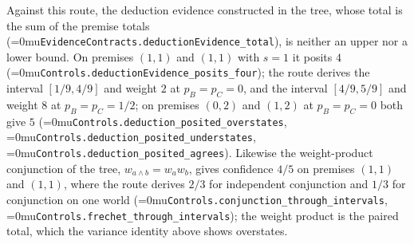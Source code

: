 \documentclass[11pt]{article}
\newcommand{\leanname}[1]{\textup{\Urlmuskip=0mu\relax\nolinkurl{#1}}}
\theoremstyle{definition}
\theoremstyle{remark}
\begin{document}
Against this route, the deduction evidence constructed in the tree, whose total
is the sum of the premise totals (\leanname{EvidenceContracts.deductionEvidence_total}),
is neither an upper nor a lower bound.  On premises $(1,1)$ and $(1,1)$ with
$s=1$ it posits $4$ (\leanname{Controls.deductionEvidence_posits_four}); the
route derives the interval $[1/9,4/9]$ and weight $2$ at $p_B=p_C=0$, and the
interval $[4/9,5/9]$ and weight $8$ at $p_B=p_C=1/2$; on premises $(0,2)$ and
$(1,2)$ at $p_B=p_C=0$ both give $5$ (\leanname{Controls.deduction_posited_overstates},
\leanname{Controls.deduction_posited_understates},
\leanname{Controls.deduction_posited_agrees}).  Likewise the weight-product
conjunction of the tree, $w_{a\wedge b}=w_aw_b$, gives confidence $4/5$ on
premises $(1,1)$ and $(1,1)$, where the route derives $2/3$ for independent
conjunction and $1/3$ for conjunction on one world
(\leanname{Controls.conjunction_through_intervals},
\leanname{Controls.frechet_through_intervals}); the weight product is the paired
total, which the variance identity above shows overstates.
\end{document}
